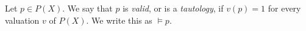 Let $p \in P(X)$. We say that $p$ is \emph{valid}, or is a \emph{tautology}, if $v(p) = 1$ for every valuation $v$ of $P(X)$. We write this as $\models p$.
